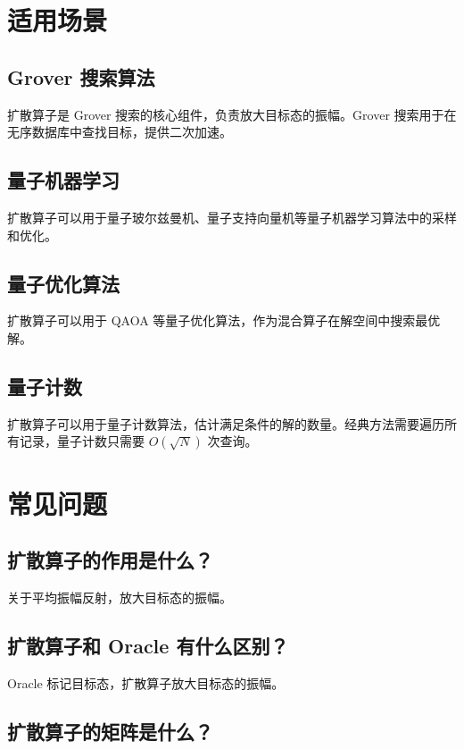 \documentclass[12pt,a4paper]{article}
\begin{document}
\section{适用场景}

\subsection{Grover 搜索算法}

扩散算子是 Grover 搜索的核心组件，负责放大目标态的振幅。Grover 搜索用于在无序数据库中查找目标，提供二次加速。

\subsection{量子机器学习}

扩散算子可以用于量子玻尔兹曼机、量子支持向量机等量子机器学习算法中的采样和优化。

\subsection{量子优化算法}

扩散算子可以用于 QAOA 等量子优化算法，作为混合算子在解空间中搜索最优解。

\subsection{量子计数}

扩散算子可以用于量子计数算法，估计满足条件的解的数量。经典方法需要遍历所有记录，量子计数只需要 $O(\sqrt{N})$ 次查询。

\section{常见问题}

\subsection{扩散算子的作用是什么？}

关于平均振幅反射，放大目标态的振幅。

\subsection{扩散算子和 Oracle 有什么区别？}

Oracle 标记目标态，扩散算子放大目标态的振幅。

\subsection{扩散算子的矩阵是什么？}
\end{document}
